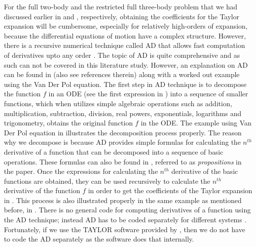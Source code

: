 For the full two-body and the restricted full three-body problem that we had discussed earlier in  and , respectively, obtaining the coefficients for the Taylor expansion will be cumbersome, especially for relatively high-orders of expansion, because the differential equations of motion have a complex structure. However, there is a recursive numerical technique called \gls{AD} that allows fast computation of derivatives upto any order \cite{taylorSoftware}. The topic of \gls{AD} is quite comprehensive and as such can not be covered in this literature study. However, an explanation on \gls{AD} can be found in \cite{taylorSoftware} (also see references therein) along with a worked out example using the Van Der Pol equation. The first step in \gls{AD} technique is to decompose the function $f$ in an \gls{ODE} (see the first expression in ) into a sequence of smaller functions, which when utilizes simple algebraic operations such as addition, multiplication, subtraction, division, real powers, exponentials, logarithms and trigonometry, obtains the original function $f$ in the \gls{ODE}. The example using Van Der Pol equation in \cite{taylorSoftware} illustrates the decomposition process properly. The reason why we decompose is because \gls{AD} provides simple formulas for calculating the $n^{th}$ derivative of a function that can be decomposed into a sequence of basic operations. These formulas can also be found in \cite{taylorSoftware}, referred to as \textit{propositions} in the paper. Once the expressions for calculating the $n^{th}$ derivative of the basic functions are obtained, they can be used recursively to calculate the $n^{th}$ derivative of the function $f$ in order to get the coefficients of the Taylor expansion in . This process is also illustrated properly in the same example as mentioned before, in \cite{taylorSoftware}. There is no general code for computing derivatives of a function using the \gls{AD} technique; instead \gls{AD} has to be coded separately for different systems \cite{taylorSoftware}. Fortunately, if we use the TAYLOR software provided by \cite{taylorSoftware}, then we do not have to code the \gls{AD} separately as the software does that internally.

